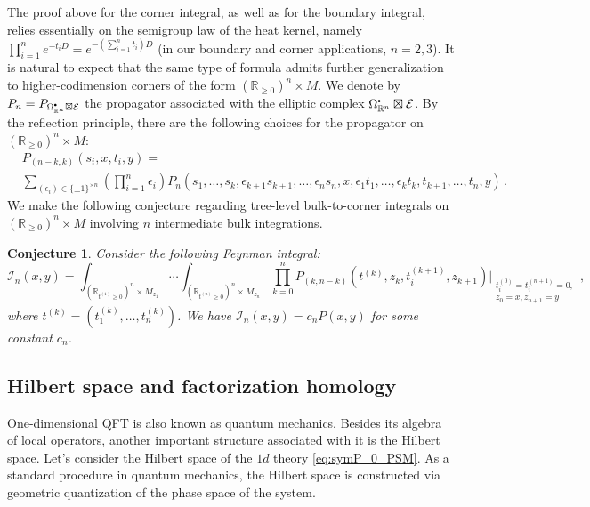\documentclass[11pt]{article}
\newcommand{\R}{\mathbb{R}}
\newcommand\sbullet[1][.5]{\mathbin{\vcenter{\hbox{\scalebox{#1}{$\bullet$}}}}}
\numberwithin{equation}{section}
\newtheorem{conj}{Conjecture}[section]
\begin{document}
The proof above for the corner integral, as well as for the boundary integral, relies essentially on the semigroup law of the heat kernel, namely $\prod_{i=1}^n e^{-t_iD}=e^{-(\sum_{i=1}^n t_i)D}$ (in our boundary and corner applications, $n=2,3$). It is natural to expect that the same type of formula admits further generalization to higher-codimension corners of the form $(\R_{\geq 0})^n\times M$. We denote by $P_n = P_{\Omega^{\sbullet}_{\R^n}\boxtimes \mathcal{E}}$ the propagator associated with the elliptic complex $\Omega^{\sbullet}_{\R^n}\boxtimes \mathcal{E}$. By the reflection principle, there are the following choices for the propagator on $(\R_{\geq 0})^n\times M$:
\begin{equation}
\begin{aligned}
		&P_{(n-k,k)}(s_i,x,t_i,y) =\\
		&\sum_{(\epsilon_i) \in \{\pm 1\}^{\times n}}(\prod_{i = 1}^n\epsilon_i)P_n(s_1,\dots,s_k,\epsilon_{k+1}s_{k+1},\dots,\epsilon_ns_n,x,\epsilon_1t_1,\dots,\epsilon_kt_k,t_{k+1},\dots,t_n,y)\,.
\end{aligned}
\end{equation}
We make the following conjecture regarding tree-level bulk-to-corner integrals on $(\R_{\geq 0})^n\times M$ involving $n$ intermediate bulk integrations.\begin{conj}
	Consider the following Feynman integral:
	\begin{equation}
		\mathcal{I}_n(x,y) = \int_{(\R_{t^{(1)}\geq 0})^n\times M_{z_1}}\cdots \int_{(\R_{t^{(n)}\geq 0})^n\times M_{z_n}}\prod_{k = 0}^nP_{(k,n-k)}(t^{(k)},z_{k},t^{(k+1)}_i,z_{k+1})\Big|_{\substack{t^{(0)}_i = t^{(n+1)}_i = 0,\\z_0 = x,z_{n+1} = y}}\,,
	\end{equation}
	where $t^{(k)} = (t^{(k)}_1,\dots,t^{(k)}_n)$. We have $\mathcal{I}_n(x,y) = c_nP(x,y)$ for some constant $c_n$.
\end{conj}

\subsection{Hilbert space and factorization homology}

One-dimensional QFT is also known as quantum mechanics. Besides its algebra of local operators, another important structure associated with it is the Hilbert space. Let's consider the Hilbert space of the $1d$ theory \ref{eq:symP_0_PSM}. As a standard procedure in quantum mechanics, the Hilbert space is constructed via geometric quantization of the phase space of the system.
\end{document}
